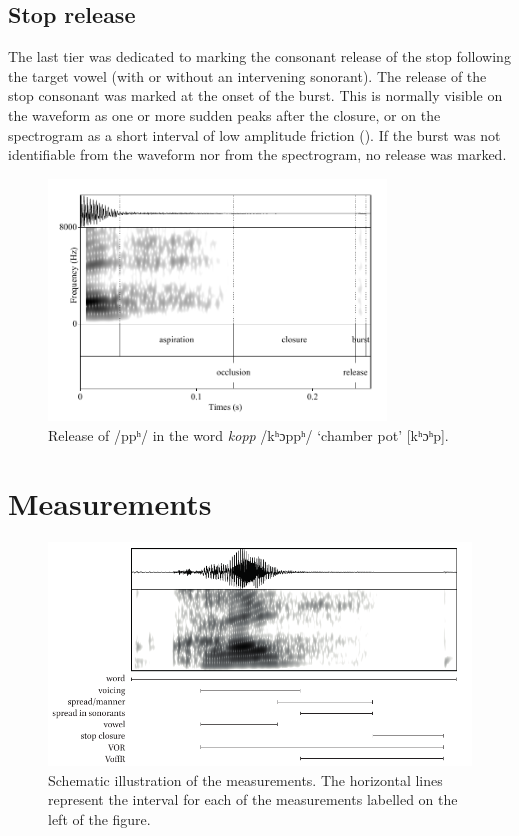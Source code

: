 \documentclass[11pt,a4paper,oneside,openany]{memoir}\usepackage[]{graphicx}\usepackage[]{color}
\begin{document}
\subsection{Stop release}
The last tier was dedicated to marking the consonant release of the stop following the target vowel (with or without an intervening sonorant).
The release of the stop consonant was marked at the onset of the burst.
This is normally visible on the waveform as one or more sudden peaks after the closure, or on the spectrogram as a short interval of low amplitude friction ().
If the burst was not identifiable from the waveform nor from the spectrogram, no release was marked.

\begin{figure}
\centering
\includegraphics[width=0.8\textwidth]{kopp}
\caption[Release of /ppʰ/]{Release of /ppʰ/ in the word \textit{kopp} /kʰɔppʰ/ `chamber pot' [kʰɔʰp].}
\label{f:release}
\end{figure}

\section{Measurements}
\label{s:measurements}

\begin{figure}
\centering
\includegraphics[width=\linewidth]{../img/measures}
\caption[Schematic illustration of the measurements]{Schematic illustration of the measurements.
The horizontal lines represent the interval for each of the measurements labelled on the left of the figure.
}
\label{f:measures}
\end{figure}
\end{document}
